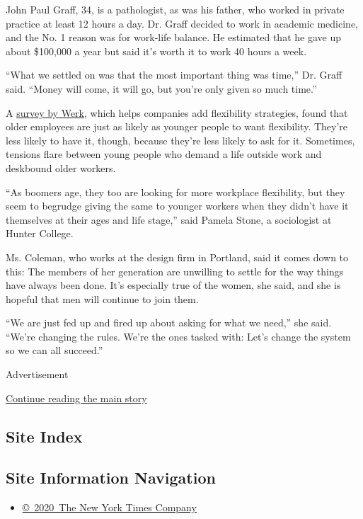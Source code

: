 John Paul Graff, 34, is a pathologist, as was his father, who worked in
private practice at least 12 hours a day. Dr. Graff decided to work in
academic medicine, and the No. 1 reason was for work-life balance. He
estimated that he gave up about \$100,000 a year but said it's worth it
to work 40 hours a week.

``What we settled on was that the most important thing was time,'' Dr.
Graff said. ``Money will come, it will go, but you're only given so much
time.''

A \href{https://werk.co/research}{survey by Werk}, which helps companies
add flexibility strategies, found that older employees are just as
likely as younger people to want flexibility. They're less likely to
have it, though, because they're less likely to ask for it. Sometimes,
tensions flare between young people who demand a life outside work and
deskbound older workers.

``As boomers age, they too are looking for more workplace flexibility,
but they seem to begrudge giving the same to younger workers when they
didn't have it themselves at their ages and life stage,'' said Pamela
Stone, a sociologist at Hunter College.

Ms. Coleman, who works at the design firm in Portland, said it comes
down to this: The members of her generation are unwilling to settle for
the way things have always been done. It's especially true of the women,
she said, and she is hopeful that men will continue to join them.

``We are just fed up and fired up about asking for what we need,'' she
said. ``We're changing the rules. We're the ones tasked with: Let's
change the system so we can all succeed.''

Advertisement

\protect\hyperlink{after-bottom}{Continue reading the main story}

\hypertarget{site-index}{%
\subsection{Site Index}\label{site-index}}

\hypertarget{site-information-navigation}{%
\subsection{Site Information
Navigation}\label{site-information-navigation}}

\begin{itemize}
\tightlist
\item
  \href{https://help.nytimes3xbfgragh.onion/hc/en-us/articles/115014792127-Copyright-notice}{©~2020~The
  New York Times Company}
\end{itemize}

